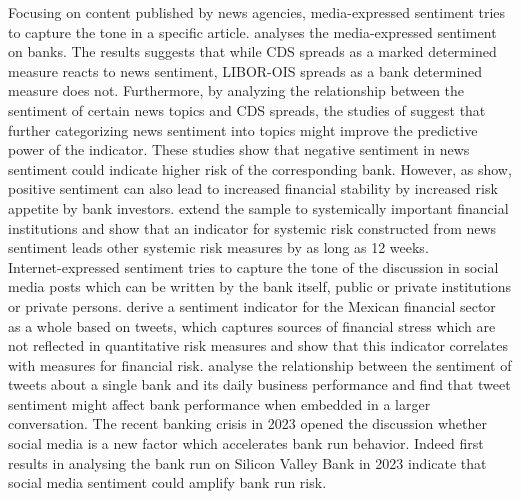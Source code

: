  Focusing on content published by news agencies, media-expressed sentiment tries to capture the tone in a specific article. \cite{smales2016} analyses the media-expressed sentiment on banks. The results suggests that while CDS spreads as a marked determined measure reacts to news sentiment, LIBOR-OIS spreads as a bank determined measure does not. Furthermore, by analyzing the relationship between the sentiment of certain news topics and CDS spreads, the studies of \cite{roeder2020} suggest that further categorizing news sentiment into topics might improve the predictive power of the indicator. These studies show that negative sentiment in news sentiment could indicate higher risk of the corresponding bank. However, as \cite{agoraki2022} show, positive sentiment can also lead to increased financial stability by increased risk appetite by bank investors. \cite{borovkova2017} extend the sample to systemically important financial institutions and show that an indicator for systemic risk constructed from news sentiment leads other systemic risk measures by as long as 12 weeks. \\
 
 Internet-expressed sentiment tries to capture the tone of the discussion in social media posts which can be written by the bank itself, public or private institutions or private persons. \cite{fernandez2021} derive a sentiment indicator for the Mexican financial sector as a whole based on tweets, which captures sources of financial stress which are not reflected in quantitative risk measures and show that this indicator correlates with measures for financial risk. \cite{illia2021} analyse the relationship between the sentiment of tweets about a single bank and its daily business performance and find that tweet sentiment might affect bank performance when embedded in a larger conversation. The recent banking crisis in 2023 opened the discussion whether social media is a new factor which accelerates bank run behavior. Indeed first results in \cite{cookson2023} analysing the bank run on Silicon Valley Bank in 2023 indicate that social media sentiment could amplify bank run risk.

%
%

\cleardoublepage
